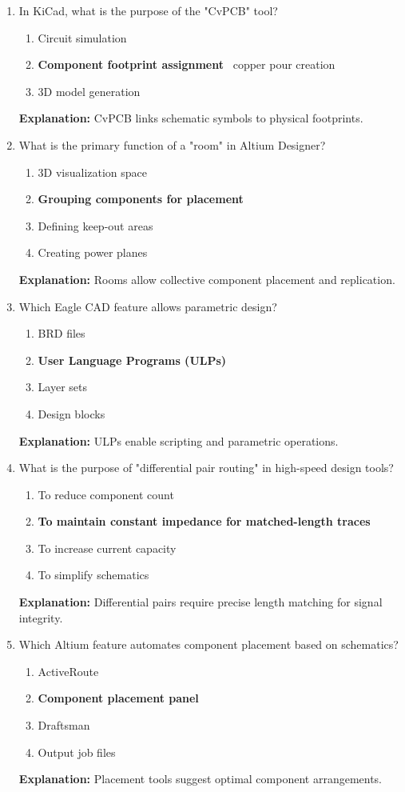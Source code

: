 \documentclass{article}
\begin{document}
	\begin{enumerate}[resume]
		\item In KiCad, what is the purpose of the "CvPCB" tool?
		\begin{enumerate}
			\item Circuit simulation
			\item \textbf{Component footprint assignment}
			\ copper pour creation
			\item 3D model generation
		\end{enumerate}
		\textbf{Explanation:} CvPCB links schematic symbols to physical footprints.
		
		\item What is the primary function of a "room" in Altium Designer?
		\begin{enumerate}
			\item 3D visualization space
			\item \textbf{Grouping components for placement}
			\item Defining keep-out areas
			\item Creating power planes
		\end{enumerate}
		\textbf{Explanation:} Rooms allow collective component placement and replication.
		
		\item Which Eagle CAD feature allows parametric design?
		\begin{enumerate}
			\item BRD files
			\item \textbf{User Language Programs (ULPs)}
			\item Layer sets
			\item Design blocks
		\end{enumerate}
		\textbf{Explanation:} ULPs enable scripting and parametric operations.
		
		\item What is the purpose of "differential pair routing" in high-speed design tools?
		\begin{enumerate}
			\item To reduce component count
			\item \textbf{To maintain constant impedance for matched-length traces}
			\item To increase current capacity
			\item To simplify schematics
		\end{enumerate}
		\textbf{Explanation:} Differential pairs require precise length matching for signal integrity.
		
		\item Which Altium feature automates component placement based on schematics?
		\begin{enumerate}
			\item ActiveRoute
			\item \textbf{Component placement panel}
			\item Draftsman
			\item Output job files
		\end{enumerate}
		\textbf{Explanation:} Placement tools suggest optimal component arrangements.
	\end{enumerate}
	
\end{document}
